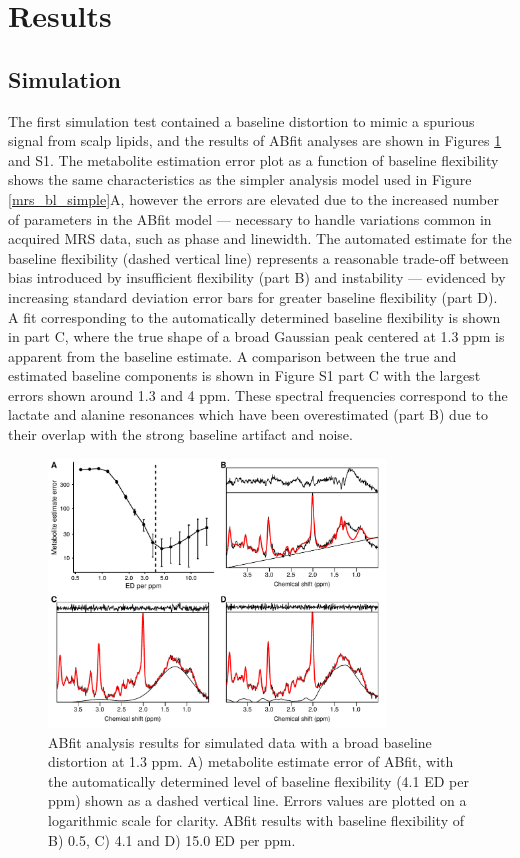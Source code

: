 \documentclass[num-refs]{wiley-article}
\begin{document}
\section{Results}
\subsection{Simulation}
The first simulation test contained a baseline distortion to mimic a spurious signal from scalp lipids, and the results of ABfit analyses are shown in Figures \ref{broad_bl} and S1. The metabolite estimation error plot as a function of baseline flexibility shows the same characteristics as the simpler analysis model used in Figure \ref{mrs_bl_simple}A, however the errors are elevated due to the increased number of parameters in the ABfit model --- necessary to handle variations common in acquired MRS data, such as phase and linewidth. The automated estimate for the baseline flexibility (dashed vertical line) represents a reasonable trade-off between bias introduced by insufficient flexibility (part B) and instability --- evidenced by increasing standard deviation error bars for greater baseline flexibility (part D). A fit corresponding to the automatically determined baseline flexibility is shown in part C, where the true shape of a broad Gaussian peak centered at 1.3 ppm is apparent from the baseline estimate. A comparison between the true and estimated baseline components is shown in Figure S1 part C with the largest errors shown around 1.3 and 4 ppm. These spectral frequencies correspond to the lactate and alanine resonances which have been overestimated (part B) due to their overlap with the strong baseline artifact and noise.

\begin{figure}
  \begin{center}
    \includegraphics[width=0.8\textwidth]{fig4}
    \caption{ABfit analysis results for simulated data with a broad baseline distortion at 1.3 ppm. A) metabolite estimate error of ABfit, with the automatically determined level of baseline flexibility (4.1 ED per ppm) shown as a dashed vertical line. Errors values are plotted on a logarithmic scale for clarity. ABfit results with baseline flexibility of B) 0.5, C) 4.1 and D) 15.0 ED per ppm.}
    \label{broad_bl}
  \end{center}
\end{figure}
\end{document}
